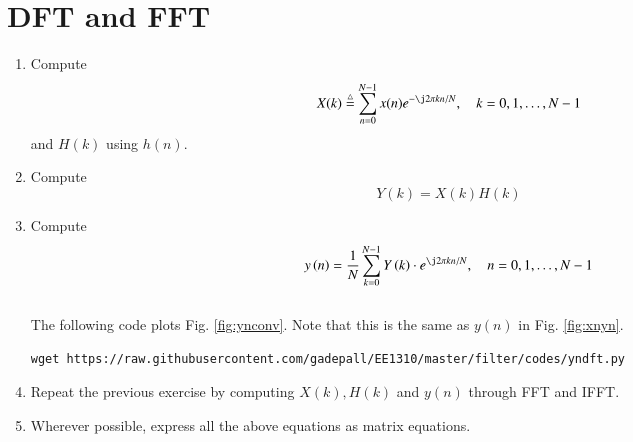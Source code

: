 \documentclass[journal,12pt,twocolumn]{IEEEtran}
\renewcommand\thesection{\arabic{section}}
\begin{document}
\section{DFT and FFT}
\begin{enumerate}[label=\thesection.\arabic*]
     \item
           Compute
           \begin{equation}
                X(k) \define \sum _{n=0}^{N-1}x(n) e^{-\j2\pi kn/N}, \quad k = 0,1,\dots, N-1
           \end{equation}
           and $H(k)$ using $h(n)$.
     \item Compute
           \begin{equation}
                Y(k) = X(k)H(k)
           \end{equation}
     \item Compute
           \begin{equation}
                y\brak{n}={\frac {1}{N}}\sum _{k=0}^{N-1}Y\brak{k}\cdot e^{\j 2\pi kn/N},\quad n = 0,1,\dots, N-1
           \end{equation}
           \\
           \solution The following code plots Fig. \ref{fig:ynconv}. Note that this is the same as
           $y(n)$ in  Fig.
           \ref{fig:xnyn}.
           \begin{lstlisting}
wget https://raw.githubusercontent.com/gadepall/EE1310/master/filter/codes/yndft.py
\end{lstlisting}
     \item Repeat the previous exercise by computing $X(k), H(k)$ and $y(n)$ through FFT and
           IFFT.
     \item Wherever possible, express all the above equations as matrix equations.
\end{enumerate}
\end{document}
